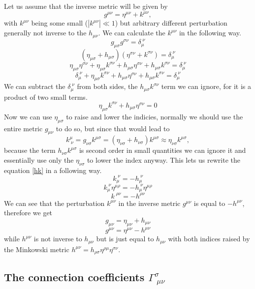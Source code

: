 Let us assume that the inverse metric will be given by
\begin{equation}
    g^{\mu\nu} = \eta^{\mu\nu} + k^{\mu\nu},
\end{equation}
with $k^{\mu\nu}$ being some small ($|k^{\mu\nu}|\ll1$) but arbitrary different perturbation generally not inverse to the $h_{\mu\nu}$. We can calculate the $k^{\mu\nu}$ in the following way.
$$g_{\mu\sigma}g^{\sigma\nu} = \delta_{\mu}^{\;\nu}$$
$$(\eta_{\mu\sigma}+h_{\mu\sigma})(\eta^{\sigma\nu}+k^{\sigma\nu}) = \delta_{\mu}^{\;\nu}$$
$$\eta_{\mu\sigma}\eta^{\sigma\nu}+\eta_{\mu\sigma}k^{\sigma\nu}+h_{\mu\sigma}\eta^{\sigma\nu}+h_{\mu\sigma}k^{\sigma\nu} = \delta_{\mu}^{\;\nu}$$
$$\delta_{\mu}^{\;\nu}+\eta_{\mu\sigma}k^{\sigma\nu}+h_{\mu\sigma}\eta^{\sigma\nu}+h_{\mu\sigma}k^{\sigma\nu} = \delta_{\mu}^{\;\nu}$$
We can subtract the $\delta_{\mu}^{\;\nu}$ from both sides, the $h_{\mu\sigma}k^{\sigma\nu}$ term we can ignore, for it is a product of two small terms.
\begin{equation}\label{hk}
    \eta_{\mu\sigma}k^{\sigma\nu}+h_{\mu\sigma}\eta^{\sigma\nu} = 0    
\end{equation}
Now we can use $\eta_{\mu\sigma}$ to raise and lower the indicies, normally we should use the entire metric $g_{\mu\nu}$ to do so, but since that would lead to
$$k^\mu_{\;\nu} = g_{\nu\sigma}k^{\mu\sigma} = (\eta_{\nu\sigma} + h_{\nu\sigma})k^{\mu\sigma} \approx \eta_{\nu\sigma}k^{\mu\sigma},$$
because the term $h_{\nu\sigma}k^{\mu\sigma}$ is second order in small quantities we can ignore it and essentially use only the $\eta_{\nu\sigma}$ to lower the index anyway. This lets us rewrite the equation \ref{hk} in a following way.
$$k_{\mu}^{\;\nu} = -h_{\mu}^{\;\nu}$$
$$k_{\mu}^{\;\nu}\eta^{\mu\rho} = -h_{\mu}^{\;\nu}\eta^{\mu\rho}$$
$$k^{\;\rho\nu} = -h^{\rho\nu}$$
We can see that the perturbation $k^{\mu\nu}$ in the inverse metric $g^{\mu\nu}$ is equal to $-h^{\mu\nu}$, therefore we get
$$\boxed{g_{\mu\nu} = \eta_{\mu\nu} + h_{\mu\nu}}$$
$$\boxed{g^{\mu\nu} = \eta^{\mu\nu} - h^{\mu\nu}}$$
while $h^{\mu\nu}$ is not inverse to $h_{\mu\nu}$ but is just equal to $h_{\mu\nu}$ with both indices raised by the Minkowski metric $h^{\mu\nu} = h_{\rho\sigma}\eta^{\rho\mu}\eta^{\sigma\nu}$.

\subsection{The connection coefficients $\Gamma^{\sigma}_{\;\mu\nu}$}

